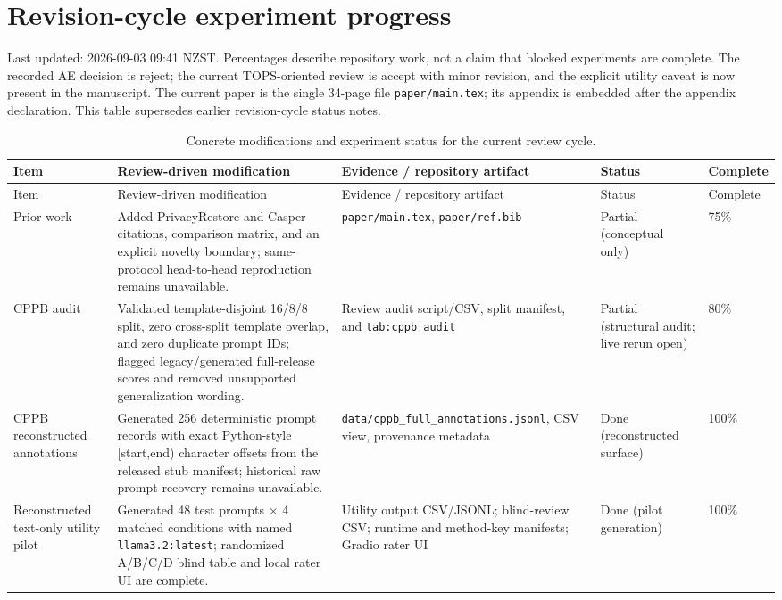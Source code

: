 \documentclass[11pt]{article}
\begin{document}
\section*{Revision-cycle experiment progress}
\noindent
Last updated: 2026-09-03 09:41 NZST. Percentages describe repository work,
not a claim that blocked experiments are complete. The recorded AE decision is
reject; the current TOPS-oriented review is accept with minor revision, and the
explicit utility caveat is now present in the manuscript. The current paper is
the single 34-page file \texttt{paper/main.tex}; its appendix is embedded
after the appendix declaration. This table supersedes earlier
revision-cycle status notes.

\scriptsize
\begin{longtable}{p{}p{}p{}p{}p{}}
\caption{Concrete modifications and experiment status for the current review cycle.}\label{tab:revision_progress}\\
\toprule
Item & Review-driven modification & Evidence / repository artifact & Status & Complete \\
\midrule
\endfirsthead
\toprule
Item & Review-driven modification & Evidence / repository artifact & Status & Complete \\
\midrule
\endhead
\bottomrule
\endfoot
Prior work & Added PrivacyRestore and Casper citations, comparison matrix, and an explicit novelty boundary; same-protocol head-to-head reproduction remains unavailable. & \texttt{paper/main.tex}, \texttt{paper/ref.bib} & Partial (conceptual only) & 75\% \\
CPPB audit & Validated template-disjoint 16/8/8 split, zero cross-split template overlap, and zero duplicate prompt IDs; flagged legacy/generated full-release scores and removed unsupported generalization wording. & Review audit script/CSV, split manifest, and \texttt{tab:cppb\_audit} & Partial (structural audit; live rerun open) & 80\% \\
CPPB reconstructed annotations & Generated 256 deterministic prompt records with exact Python-style [start,end) character offsets from the released stub manifest; historical raw prompt recovery remains unavailable. & \texttt{data/cppb\_full\_annotations.jsonl}, CSV view, provenance metadata & Done (reconstructed surface) & 100\% \\
Reconstructed text-only utility pilot & Generated 48 test prompts $\times$ 4 matched conditions with named \texttt{llama3.2:latest}; randomized A/B/C/D blind table and local rater UI are complete. & Utility output CSV/JSONL; blind-review CSV; runtime and method-key manifests; Gradio rater UI & Done (pilot generation) & 100\% \\

\end{longtable}
\end{document}
